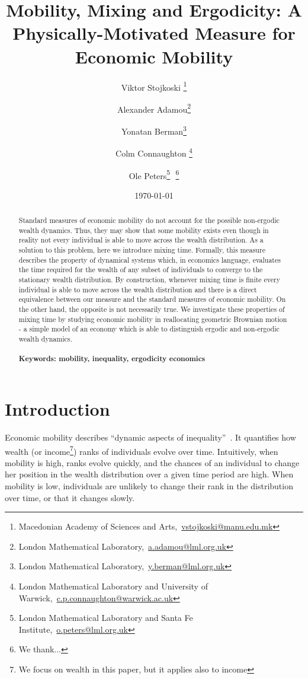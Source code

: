 \documentclass[11pt]{article}
\newcommand{\bc}{\begin{center}}
\newcommand{\ec}{\end{center}}
\newcommand{\red}[1]{{\color{red} #1}}
\numberwithin{equation}{section}
\begin{document}
\begin{titlepage}
\title{Mobility, Mixing and Ergodicity: A Physically-Motivated Measure for Economic Mobility}
\author{Viktor Stojkoski \footnote{Macedonian Academy of Sciences and Arts,~\url{vstojkoski@manu.edu.mk}} \and Alexander Adamou\footnote{London Mathematical Laboratory,~\url{a.adamou@lml.org.uk}} \and Yonatan Berman\footnote{London Mathematical Laboratory,~\url{y.berman@lml.org.uk}} \and Colm Connaughton \footnote{London Mathematical Laboratory and University of Warwick,~\url{c.p.connaughton@warwick.ac.uk}} \and Ole Peters\footnote{London Mathematical Laboratory and Santa Fe Institute,~\url{o.peters@lml.org.uk}}\,\, \thanks{We thank...}}
\date{\today}
\maketitle
\begin{abstract}
Standard measures of economic mobility do not account for the possible non-ergodic wealth dynamics. Thus, they may show that some mobility exists even though in reality not every individual is able to move across the wealth distribution. As a solution to this problem, here we introduce mixing time. Formally, this measure describes the property of dynamical systems which, in economics language, evaluates the time required for the wealth of any subset of individuals to converge to the stationary wealth distribution. By construction, whenever mixing time is finite every individual is able to move across the wealth distribution and there is a direct equivalence between our measure and the standard measures of economic mobility. On the other hand, the opposite is not necessarily true. We investigate these properties of mixing time by studying economic mobility in reallocating geometric Brownian motion - a simple model of an economy which is able to distinguish ergodic and non-ergodic wealth dynamics.
\noindent 
\\
\\
\noindent\textbf{Keywords: mobility, inequality, ergodicity economics}
\end{abstract}
\setcounter{page}{0}
\thispagestyle{empty}
\end{titlepage}
\pagebreak \newpage
\section{Introduction}\label{sec:introduction}
Economic mobility describes ``dynamic aspects of inequality''~\citep{Shorrocks1978}. It quantifies how wealth (or income\footnote{We focus on wealth in this paper, but it applies also to income}) ranks of individuals evolve over time. Intuitively, when mobility is high, ranks evolve quickly, and the chances of an individual to change her position in the wealth distribution over a given time period are high. When mobility is low, individuals are unlikely to change their rank in the distribution over time, or that it changes slowly.
\end{document}
